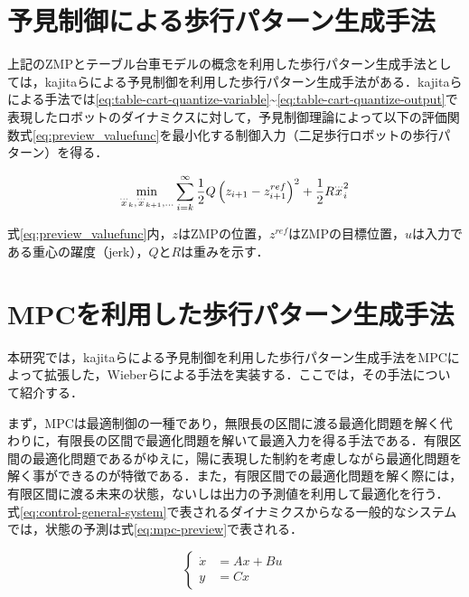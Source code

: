 \newpage

\section{予見制御による歩行パターン生成手法}
上記のZMPとテーブル台車モデルの概念を利用した歩行パターン生成手法としては，kajitaらによる予見制御を利用した歩行パターン生成手法\cite{PREVIEW}がある．kajitaらによる手法では\eqref{eq:table-cart-quantize-variable}\textasciitilde\eqref{eq:table-cart-quantize-output}で表現したロボットのダイナミクスに対して，予見制御理論によって以下の評価関数式\eqref{eq:preview_valuefunc}を最小化する制御入力（二足歩行ロボットの歩行パターン）を得る．

\begin{equation}
  \min_{{\buildrel\ldots\over{x}}_{k},{\buildrel\ldots\over{x}}_{k+1},\ldots}\sum_{i=k}^{\infty}{1\over 2}Q\left(z_{i+1}-z_{i+1}^{ref}\right)^{2}+{1\over 2}R{\buildrel\ldots\over{x}}_{i}^{2}
  \label{eq:preview_valuefunc}
\end{equation}

式\eqref{eq:preview_valuefunc}内，$z$はZMPの位置，$z^{ref}$はZMPの目標位置，$u$は入力である重心の躍度（jerk），$Q$と$R$は重みを示す．

\section{MPCを利用した歩行パターン生成手法}
本研究では，kajitaらによる予見制御を利用した歩行パターン生成手法\cite{PREVIEW}をMPCによって拡張した，Wieberらによる手法\cite{WIEBER}を実装する．ここでは，その手法\cite{WIEBER}について紹介する．

まず，MPCは最適制御の一種であり，無限長の区間に渡る最適化問題を解く代わりに，有限長の区間で最適化問題を解いて最適入力を得る手法である．有限区間の最適化問題であるがゆえに，陽に表現した制約を考慮しながら最適化問題を解く事ができるのが特徴である．また，有限区間での最適化問題を解く際には，有限区間に渡る未来の状態，ないしは出力の予測値を利用して最適化を行う．
式\eqref{eq:control-general-system}で表されるダイナミクスからなる一般的なシステムでは，状態の予測は式\eqref{eq:mpc-preview}で表される．

\begin{equation}
  \begin{cases}
    \dot{x} & = Ax + Bu \\
    y       & = Cx
  \end{cases}
  \label{eq:control-general-system}
\end{equation}

